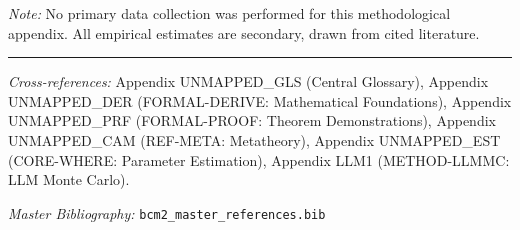 \noindent\textit{Note:} No primary data collection was performed for this methodological
appendix. All empirical estimates are secondary, drawn from cited literature.



\vspace{1em}
\hrule
\vspace{0.5em}

\noindent\textit{Cross-references:}
Appendix UNMAPPED_GLS (Central Glossary),
Appendix UNMAPPED_DER (FORMAL-DERIVE: Mathematical Foundations),
Appendix UNMAPPED_PRF (FORMAL-PROOF: Theorem Demonstrations),
Appendix UNMAPPED_CAM (REF-META: Metatheory),
Appendix UNMAPPED_EST (CORE-WHERE: Parameter Estimation),
Appendix LLM1 (METHOD-LLMMC: LLM Monte Carlo).

\noindent\textit{Master Bibliography:} \texttt{bcm2\_master\_references.bib}

